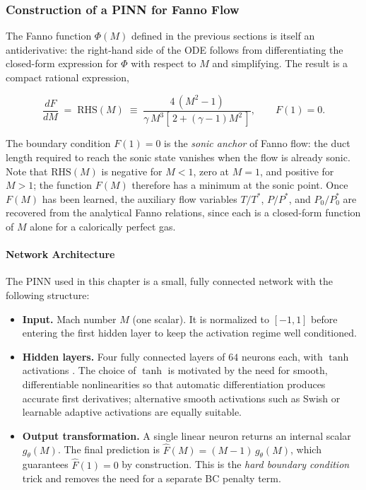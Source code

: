 \documentclass[11pt,a4paper]{report}
\begin{document}
\subsubsection{Construction of a PINN for Fanno Flow}
The Fanno function $\Phi(M)$ defined in the previous sections is itself an antiderivative: the right-hand side of the ODE follows from differentiating the closed-form expression for $\Phi$ with respect to $M$ and simplifying. The result is a compact rational expression,

\begin{equation}
\label{eq:fanno_ode}
\frac{dF}{dM} \;=\; \mathrm{RHS}(M) \;\equiv\; \frac{4\,(M^{2}-1)}{\gamma\,M^{3}\left[\,2+(\gamma-1)M^{2}\,\right]}, \qquad F(1) = 0.
\end{equation}

The boundary condition $F(1) = 0$ is the \emph{sonic anchor} of Fanno flow: the duct length required to reach the sonic state vanishes when the flow is already sonic. Note that $\mathrm{RHS}(M)$ is negative for $M < 1$, zero at $M = 1$, and positive for $M > 1$; the function $F(M)$ therefore has a minimum at the sonic point. Once $F(M)$ has been learned, the auxiliary flow variables $T/T^*$, $P/P^*$, and $P_0/P_0^*$ are recovered from the analytical Fanno relations, since each is a closed-form function of $M$ alone for a calorically perfect gas.

\paragraph{Network Architecture}
The PINN used in this chapter is a small, fully connected network with the following structure:

\begin{itemize}
    \item \textbf{Input.} Mach number $M$ (one scalar). It is normalized to $[-1, 1]$ before entering the first hidden layer to keep the activation regime well conditioned.
    \item \textbf{Hidden layers.} Four fully connected layers of $64$ neurons each, with $\tanh$ activations \cite{Goodfellow2016}. The choice of $\tanh$ is motivated by the need for smooth, differentiable nonlinearities so that automatic differentiation produces accurate first derivatives; alternative smooth activations such as Swish \cite{Ramachandran2017} or learnable adaptive activations \cite{Jagtap2020} are equally suitable.
    \item \textbf{Output transformation.} A single linear neuron returns an internal scalar $g_{\theta}(M)$. The final prediction is $\hat{F}(M) = (M-1)\,g_{\theta}(M)$, which guarantees $\hat{F}(1) = 0$ by construction. This is the \emph{hard boundary condition} trick and removes the need for a separate BC penalty term.
\end{itemize}
\end{document}
